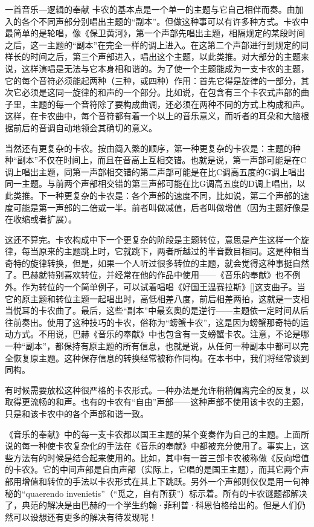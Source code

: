 \begin{intro}{一首音乐—逻辑的奉献}
卡农的基本点是一个单一的主题与它自己相伴而奏。由加入的各个不同声部分别唱出主题的“副本”。但做这种事可以有许多种方式。卡农中最简单的是轮唱，像《保卫黄河》，第一个声部先唱出主题，相隔规定的某段时间之后，这一主题的“副本”在完全一样的调上进入。在这第二个声部进行到规定的同样长的时间之后，第三个声部进入，唱出这个主题，以此类推。对大部分的主题来说，这样演唱是无法与它本身相和谐的。为了使一个主题能成为一支卡农的主题，它的每个音符必须能起两种（三种，或四种）作用：首先它得是旋律的一部分，其次它必须是这同一旋律的和声的一个部分。比如说，在包含有三个卡农式声部的曲子里，主题的每一个音符除了要构成曲调，还必须在两种不同的方式上构成和声。这样，在卡农曲中，每个音符都有着一个以上的音乐意义，而听者的耳朵和大脑根据前后的音调自动地领会其确切的意义。

当然还有更复杂的卡农。按由简入繁的顺序，第一种更复杂的卡农是：主题的种种“副本”不仅在时间上，而且在音高上互相交错。也就是说，第一声部可能是在C调上唱出主题，同第一声部相交错的第二声部可能是在比C调高五度的G调上唱出同一主题。与前两个声部相交错的第三声部可能在比G调高五度的D调上唱出，以此类推。下一种更复杂的卡农是：各个声部的速度不同，比如说，第二个声部的速度可能是第一声部的二倍或一半。前者叫做减值，后者叫做增值（因为主题好像是在收缩或者扩展）。

这还不算完。卡农构成中下一个更复杂的阶段是主题转位，意思是产生这样一个旋律，每当原来的主题跳上时，它就跳下，两者所越过的半音数目相同。这是种相当奇特的旋律转换，但是，如果一个人听过很多转位的主题，就会觉得这种事挺自然了。巴赫就特别喜欢转位，并经常在他的作品中使用——《音乐的奉献》也不例外。作为转位的一个简单例子，可以试着唱唱《好国王温赛拉斯》[]这支曲子。当它的原主题和转位主题一起唱出时，高低相差八度，前后相差两拍，这就是一支相当悦耳的卡农曲了。最后，这些“副本”中最玄奥的是逆行——主题依一定时间从后往前奏出。使用了这种技巧的卡农，俗称为“螃蟹卡农”，这是因为螃蟹那奇特的运动方式。不用说，巴赫《音乐的奉献》中也包含有一支螃蟹卡农。注意，不论是哪一种“副本”，都保持有原主题的所有信息，也就是说，从任何一种副本中都可以完全恢复原主题。这种保存信息的转换经常被称作同构。在本书中，我们将经常谈到同构。

有时候需要放松这种很严格的卡农形式。一种办法是允许稍稍偏离完全的反复，以取得更流畅的和声。也有的卡农有“自由”声部——这种声部不使用该卡农的主题，只是和该卡农中的各个声部和谐一致。

《音乐的奉献》中的每一支卡农都以国王主题的某个变奏作为自己的主题。上面所说的每一种使卡农复杂化的手法在《音乐的奉献》中都被充分使用了。事实上，这些方法有的时候是结合起来使用的。比如，其中有一首三部卡农被称做《反向增值的卡农》。它的中间声部是自由声部（实际上，它唱的是国王主题），而其它两个声部用增值和转位的手法以卡农形式在其上下跳跃。另外一个声部则仅仅是用一句神秘的“quaerendo invenietis”（“觅之，自有所获”）标示着。所有的卡农谜题都解决了，典范的解决是由巴赫的一个学生约翰·菲利普·科恩伯格给出的。但是人们仍然可以设想还有更多的解决有待发现呢！


\end{intro}
